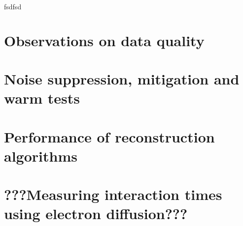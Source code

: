 fsdfsd

\section{Observations on data quality}  %

\section{Noise suppression, mitigation and warm tests}  \label{All the noise}%

\section{Performance of reconstruction algorithms}  %

\section{???Measuring interaction times using electron diffusion???}  %

